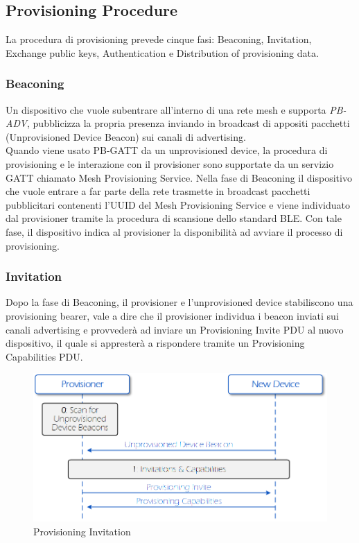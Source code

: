 \subsection{Provisioning Procedure}
La procedura di provisioning prevede cinque fasi: Beaconing, Invitation, Exchange public keys, Authentication e Distribution of provisioning data.

\subsubsection{Beaconing}
Un dispositivo che vuole subentrare all'interno di una rete mesh e supporta \textit{PB-ADV}, pubblicizza la propria presenza inviando in broadcast di appositi pacchetti (Unprovisioned Device Beacon) sui canali di advertising.\\
Quando viene usato PB-GATT da un unprovisioned device, la procedura di provisioning e le interazione con il provisioner sono supportate da un servizio GATT chiamato Mesh Provisioning Service. Nella fase di Beaconing il dispositivo che vuole entrare a far parte della rete trasmette in broadcast pacchetti pubblicitari contenenti l'UUID del Mesh Provisioning Service e viene individuato dal provisioner tramite la procedura di scansione dello standard BLE. 
Con tale fase, il dispositivo indica al provisioner la disponibilità ad avviare il processo di provisioning.

\subsubsection{Invitation}
Dopo la fase di Beaconing, il provisioner e l'unprovisioned device stabiliscono una provisioning bearer, vale a dire che il provisioner individua i beacon inviati sui canali advertising e provvederà ad inviare un Provisioning Invite PDU al nuovo dispositivo, il quale si appresterà a rispondere tramite un Provisioning Capabilities PDU.

\begin{figure}[!ht]
    \centering
    \includegraphics[width = \textwidth]{images/Provisioning_Invitation.png}
    \caption{Provisioning Invitation}
    \label{fig:provisioning_invitation}
\end{figure}

